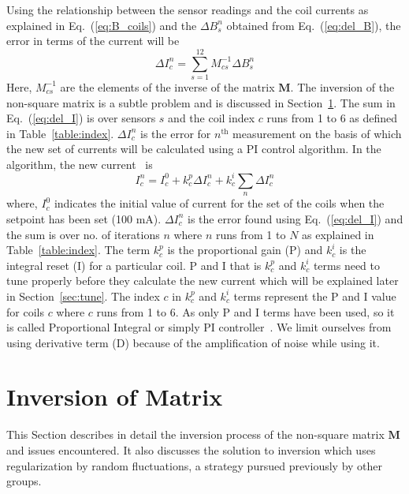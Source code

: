 Using the relationship between the sensor readings and the coil currents as explained in Eq.~(\ref{eq:B_coils}) and the $\Delta B_s^n$ obtained from Eq.~(\ref{eq:del_B}), the error in terms of the current  will be
\begin{equation}\label{eq:del_I}
    \Delta I_c^n =\sum_{s=1}^{12} M^{-1}_{cs} \Delta B_s^n
\end{equation}
Here, $M^{-1}_{cs}$ are the elements of the inverse of the matrix $\bm{M}$. The inversion of the non-square matrix is a subtle problem and is discussed in Section~\ref{sec:inv}. The sum in Eq.~(\ref{eq:del_I}) is over sensors $s$ and the coil index $c$ runs from 1 to 6 as defined in Table~\ref{table:index}. $\Delta I_c^n$ is the error for $n^{\mathrm{th}}$ measurement on the basis of which the new set of currents will be calculated using a PI control algorithm. In the algorithm, the new current~\cite{bea} is
\begin{equation}\label{eq:I}
    I^n_c=I^0_c+k^p_c \Delta I_c^n+k^i_c\sum_n \Delta I_c^n
\end{equation}
where, $I^0_c$ indicates the initial value of current for the set of the coils when the setpoint has been set (100 mA). $\Delta I_c^n$ is the error found using Eq.~(\ref{eq:del_I}) and the sum is over no. of iterations $n$ where $n$ runs from 1 to $N$ as explained in Table~\ref{table:index}. The term $k^p_c$ is the proportional gain (P) and $k^i_c$ is the integral reset (I) for a particular coil. P and I that is $k^p_c$ and $k^i_c$ terms need to tune properly before they calculate the new current which will be explained later in Section~\ref{sec:tune}. The index $c$ in $k^p_c$ and $k^i_c$ terms represent the P and I value for coils $c$ where $c$ runs from 1 to 6. As only P and I terms have been used, so it is called Proportional Integral or simply PI controller~\cite{pid}. We limit ourselves from using derivative term (D) because of the amplification of noise while using it.


\section{Inversion of Matrix}\label{sec:inv}

This Section describes in detail the inversion process of the non-square matrix $\bm{M}$ and issues encountered. It also discusses the solution to inversion which uses regularization by random fluctuations, a strategy pursued previously by other groups. 



